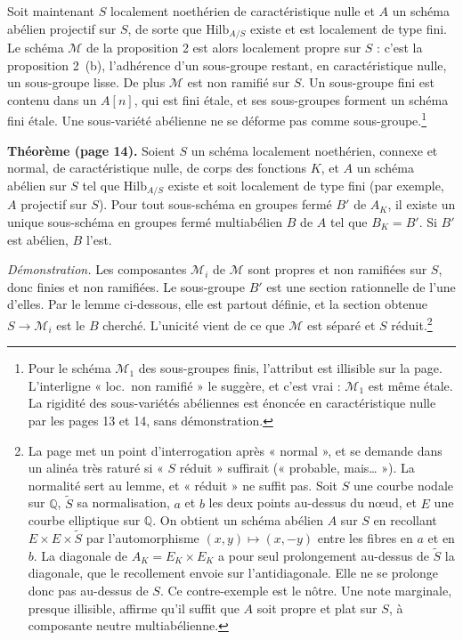 \documentclass[11pt,a4paper]{article}
\begin{document}
Soit maintenant $S$ localement noethérien de caractéristique nulle et $A$ un
schéma abélien projectif sur $S$, de sorte que $\mathrm{Hilb}_{A/S}$ existe et
est localement de type fini. Le schéma $\mathcal{M}$ de la proposition 2 est
alors localement propre sur $S$ : c'est la proposition 2~(b), l'adhérence d'un
sous-groupe restant, en caractéristique nulle, un sous-groupe lisse. De plus
$\mathcal{M}$ est non ramifié sur $S$. Un sous-groupe fini est contenu dans un
$A[n]$, qui est fini étale, et ses sous-groupes forment un schéma fini étale.
Une sous-variété abélienne ne se déforme pas comme sous-groupe.\footnote{Pour
le schéma $\mathcal{M}_{1}$ des sous-groupes finis, l'attribut est illisible
sur la page. L'interligne « loc.\ non ramifié » le suggère, et c'est vrai :
$\mathcal{M}_1$ est même étale. La rigidité des sous-variétés abéliennes est
énoncée en caractéristique nulle par les pages 13 et 14, sans démonstration.}

\textbf{Théorème (page 14).} Soient $S$ un schéma localement noethérien,
connexe et normal, de caractéristique nulle, de corps des fonctions $K$, et
$A$ un schéma abélien sur $S$ tel que $\mathrm{Hilb}_{A/S}$ existe et soit
localement de type fini (par exemple, $A$ projectif sur $S$). Pour tout
sous-schéma en groupes fermé $B'$ de $A_K$, il existe un unique sous-schéma en
groupes fermé multiabélien $B$ de $A$ tel que $B_K = B'$. Si $B'$ est
abélien, $B$ l'est.

\emph{Démonstration.} Les composantes $\mathcal{M}_i$ de $\mathcal{M}$ sont
propres et non ramifiées sur $S$, donc finies et non ramifiées. Le sous-groupe
$B'$ est une section rationnelle de l'une d'elles. Par le lemme ci-dessous,
elle est partout définie, et la section obtenue $S \to \mathcal{M}_i$ est le
$B$ cherché. L'unicité vient de ce que $\mathcal{M}$ est séparé et $S$
réduit.\footnote{La page met un point d'interrogation après « normal », et se
demande dans un alinéa très raturé si « $S$ réduit » suffirait (« probable,
mais… »). La normalité sert au lemme, et « réduit » ne suffit pas. Soit
$S$ une courbe nodale sur $\mathbb{Q}$, $\tilde{S}$ sa normalisation, $a$ et
$b$ les deux points au-dessus du nœud, et $E$ une courbe elliptique sur
$\mathbb{Q}$. On obtient un schéma abélien $A$ sur $S$ en recollant
$E \times E \times \tilde{S}$ par l'automorphisme $(x, y) \mapsto (x, -y)$
entre les fibres en $a$ et en $b$. La diagonale de $A_K = E_K \times E_K$ a
pour seul prolongement au-dessus de $\tilde{S}$ la diagonale, que le recollement
envoie sur l'antidiagonale. Elle ne se prolonge donc pas au-dessus de $S$.
Ce contre-exemple est le nôtre. Une note marginale, presque illisible, affirme qu'il suffit que $A$
soit propre et plat sur $S$, à composante neutre multiabélienne.}
\end{document}
